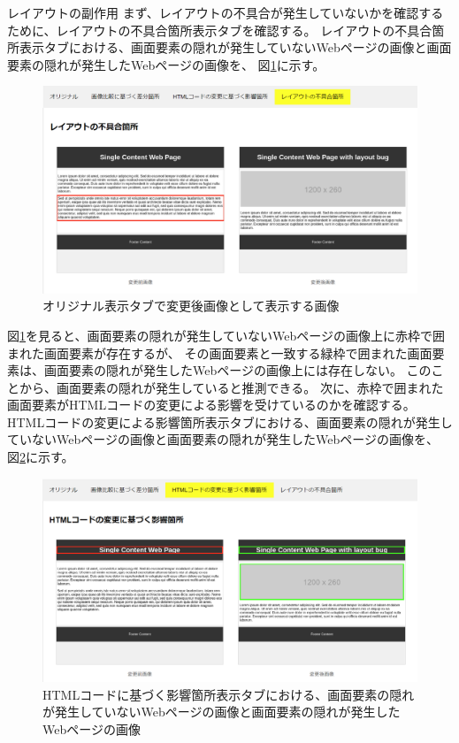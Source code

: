\par
レイアウトの副作用
まず、レイアウトの不具合が発生していないかを確認するために、レイアウトの不具合箇所表示タブを確認する。
レイアウトの不具合箇所表示タブにおける、画面要素の隠れが発生していないWebページの画像と画面要素の隠れが発生したWebページの画像を、
図\ref{fig: ex1_subeffect}に示す。
\begin{figure}[tp]
    \begin{center}
        \includegraphics[width=1.0\columnwidth]{image/5/ex1_subeffect.png}
        \caption{オリジナル表示タブで変更後画像として表示する画像}
        \label{fig: ex1_subeffect}
    \end{center}
\end{figure}
図\ref{fig: ex1_subeffect}を見ると、画面要素の隠れが発生していないWebページの画像上に赤枠で囲まれた画面要素が存在するが、
その画面要素と一致する緑枠で囲まれた画面要素は、画面要素の隠れが発生したWebページの画像上には存在しない。
このことから、画面要素の隠れが発生していると推測できる。
次に、赤枠で囲まれた画面要素がHTMLコードの変更による影響を受けているのかを確認する。
HTMLコードの変更による影響箇所表示タブにおける、画面要素の隠れが発生していないWebページの画像と画面要素の隠れが発生したWebページの画像を、
図\ref{fig: ex1_html}に示す。
\begin{figure}[tp]
    \begin{center}
        \includegraphics[width=1.0\columnwidth]{image/5/ex1_html.png}
        \caption{HTMLコードに基づく影響箇所表示タブにおける、画面要素の隠れが発生していないWebページの画像と画面要素の隠れが発生したWebページの画像}
        \label{fig: ex1_html}
    \end{center}
\end{figure}
